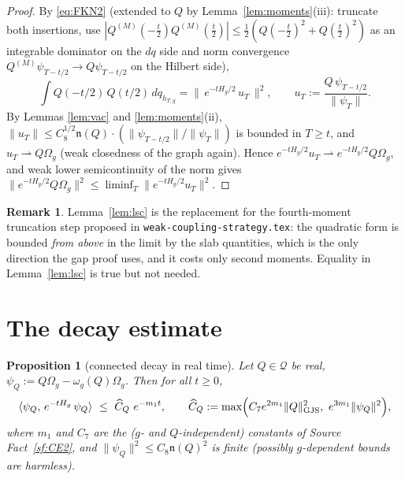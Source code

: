 \documentclass[11pt,a4paper]{article}
\theoremstyle{plain}
\newtheorem{proposition}[theorem]{Proposition}
\theoremstyle{definition}
\newtheorem{remark}[theorem]{Remark}
\newcommand{\Om}{\Omega}
\newcommand{\Q}{\mathcal{Q}}
\newcommand{\ip}[2]{\langle #1,#2\rangle}
\begin{document}
\begin{proof}
By \eqref{eq:FKN2} (extended to $Q$ by Lemma~\ref{lem:moments}(iii): truncate both insertions,
use $|Q^{(M)}(-\frac t2)Q^{(M)}(\frac t2)|\le\frac12(Q(-\frac t2)^2+Q(\frac t2)^2)$ as an
integrable dominator on the $dq$ side and norm convergence $Q^{(M)}\psi_{T-t/2}\to Q\psi_{T-t/2}$
on the Hilbert side),
\[
  \int Q(-t/2)\,Q(t/2)\,dq_{h_{T,g}}=\|\,e^{-tH_g/2}\,u_T\,\|^2,
  \qquad u_T:=\frac{Q\,\psi_{T-t/2}}{\|\psi_T\|}.
\]
By Lemmas \ref{lem:vac} and \ref{lem:moments}(ii), $\|u_T\|\le C_8^{1/2}\mathfrak n(Q)\cdot
(\|\psi_{T-t/2}\|/\|\psi_T\|)$ is bounded in $T\ge t$, and $u_T\rightharpoonup Q\Om_g$ (weak
closedness of the graph again). Hence $e^{-tH_g/2}u_T\rightharpoonup e^{-tH_g/2}Q\Om_g$, and weak
lower semicontinuity of the norm gives
$\|e^{-tH_g/2}Q\Om_g\|^2\le\liminf_T\|e^{-tH_g/2}u_T\|^2$.
\end{proof}

\begin{remark}
Lemma~\ref{lem:lsc} is the replacement for the fourth-moment truncation step proposed in
\texttt{weak-coupling-strategy.tex}: the quadratic form is bounded \emph{from above} in the limit
by the slab quantities, which is the only direction the gap proof uses, and it costs only second
moments. Equality in Lemma~\ref{lem:lsc} is true but not needed.
\end{remark}

\section{The decay estimate}\label{sec:decay}

\begin{proposition}[connected decay in real time]\label{prop:decay}
Let $Q\in\Q$ be real, $\psi_Q:=Q\Om_g-\omega_g(Q)\Om_g$. Then for all $t\ge0$,
\begin{equation}\label{eq:decay}
  \ip{\psi_Q}{\,e^{-tH_g}\,\psi_Q}\ \le\ \widehat C_Q\ e^{-m_1t},
  \qquad
  \widehat C_Q:=\max\Bigl(C_7e^{2m_1}\|Q\|_{\rm GJS}^2,\ e^{3m_1}\|\psi_Q\|^2\Bigr),
\end{equation}
where $m_1$ and $C_7$ are the ($g$- and $Q$-independent) constants of Source Fact~\ref{sf:CE2},
and $\|\psi_Q\|^2\le C_8\mathfrak n(Q)^2$ is finite (possibly $g$-dependent bounds are harmless).
\end{proposition}
\end{document}

